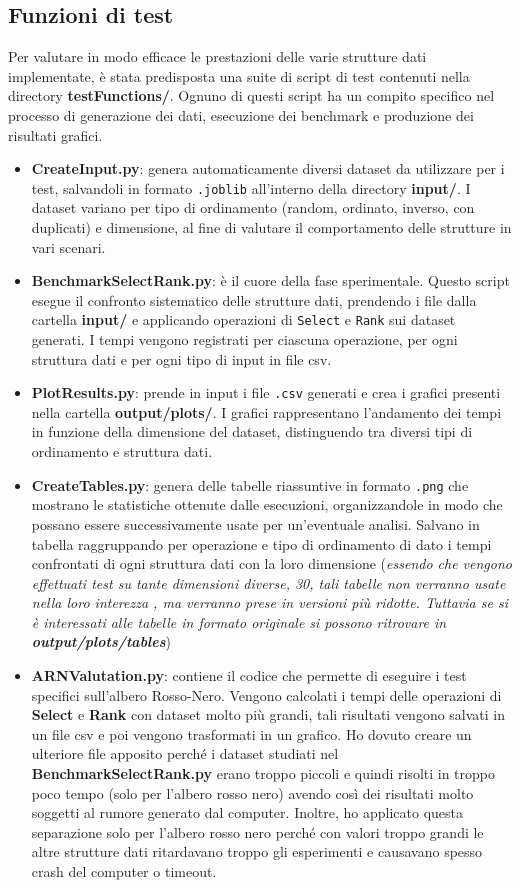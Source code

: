 \documentclass[10pt]{article}
\begin{document}
\subsection{Funzioni di test}
Per valutare in modo efficace le prestazioni delle varie strutture dati implementate, è stata predisposta una suite di script di test contenuti nella directory \textbf{testFunctions/}. Ognuno di questi script ha un compito specifico nel processo di generazione dei dati, esecuzione dei benchmark e produzione dei risultati grafici.
\begin{itemize}
    \item \textbf{CreateInput.py}: genera automaticamente diversi dataset da utilizzare per i test, salvandoli in formato \texttt{.joblib} all'interno della directory \textbf{input/}. I dataset variano per tipo di ordinamento (random, ordinato, inverso, con duplicati) e dimensione, al fine di valutare il comportamento delle strutture in vari scenari.
    \item \textbf{BenchmarkSelectRank.py}: è il cuore della fase sperimentale. Questo script esegue il confronto sistematico delle strutture dati, prendendo i file dalla cartella \textbf{input/} e applicando operazioni di \texttt{Select} e \texttt{Rank} sui dataset generati. I tempi vengono registrati per ciascuna operazione, per ogni struttura dati e per ogni tipo di input in file csv.
    \item \textbf{PlotResults.py}: prende in input i file \texttt{.csv} generati e crea i grafici presenti nella cartella \textbf{output/plots/}. I grafici rappresentano l'andamento dei tempi in funzione della dimensione del dataset, distinguendo tra diversi tipi di ordinamento e struttura dati.
    \item \textbf{CreateTables.py}: genera delle tabelle riassuntive in formato \texttt{.png} che mostrano le statistiche ottenute dalle esecuzioni, organizzandole in modo che possano essere successivamente usate per un'eventuale analisi. Salvano in tabella raggruppando per operazione e tipo di ordinamento di dato i tempi confrontati di ogni struttura dati con la loro dimensione (\textit{essendo che vengono effettuati test su tante dimensioni diverse, 30, tali tabelle non verranno usate nella loro interezza , ma verranno prese in versioni più ridotte. Tuttavia se si è interessati alle tabelle in formato originale si possono ritrovare in \textbf{output/plots/tables}})
    \item \textbf{ARNValutation.py}: contiene il codice che permette di eseguire i test specifici sull’albero Rosso-Nero. Vengono calcolati i tempi delle operazioni di \textbf{Select} e \textbf{Rank} con dataset molto più grandi, tali risultati vengono salvati in un file csv e poi vengono trasformati in un grafico. Ho dovuto creare un ulteriore file apposito perché i dataset studiati nel \textbf{BenchmarkSelectRank.py} erano troppo piccoli e quindi risolti in troppo poco tempo (solo per l'albero rosso nero) avendo così dei risultati molto soggetti al rumore generato dal computer. Inoltre, ho applicato questa separazione solo per l'albero rosso nero perché con valori troppo grandi le altre strutture dati ritardavano troppo gli esperimenti e causavano spesso crash del computer o timeout.
\end{itemize}
\end{document}
